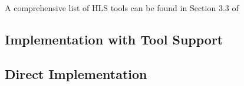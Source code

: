 A comprehensive list of HLS tools can be found in Section 3.3 of

\subsection{Implementation with Tool Support}


\subsection{Direct Implementation}

